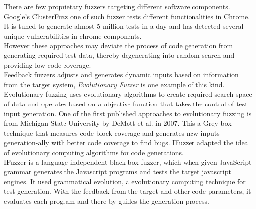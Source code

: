 \documentclass{acm_proc_article-sp}
\begin{document}
\indent There are few proprietary fuzzers targeting different software components. Google's ClusterFuzz \cite{Arya12} one of such fuzzer tests different functionalities in Chrome. It is tuned to generate almost 5 million tests in a day and has detected several unique vulnerabilities in chrome components.\\
\indent However these approaches may deviate the process of code generation from generating required test data, thereby degenerating into random search and providing low code coverage.\\ 
\indent Feedback fuzzers adjusts and generates dynamic inputs based on information from the target system, \textit{Evolutionary Fuzzer} is one example of this kind. Evolutionary fuzzing uses evolutionary algorithms to create required search space of data and operates based on a objective function that takes the control of test input generation. One of the first published approaches to evolutionary fuzzing \cite{demott2007} is from Michigan State University by DeMott et al. in 2007. This a Grey-box technique that measures code block coverage and generates new inputs generation-ally with better code coverage to find bugs. IFuzzer adapted the idea of evolutionary computing algorithms for code generations. \\
\indent IFuzzer is a language independent black box fuzzer, which when given JavaScript grammar generates the Javascript programs and tests the target javascript engines. It used grammatical evolution, a evolutionary computing technique for test generation. With the feedback from the target and other code parameters, it evaluates each program and there by guides the generation process. 
\end{document}

